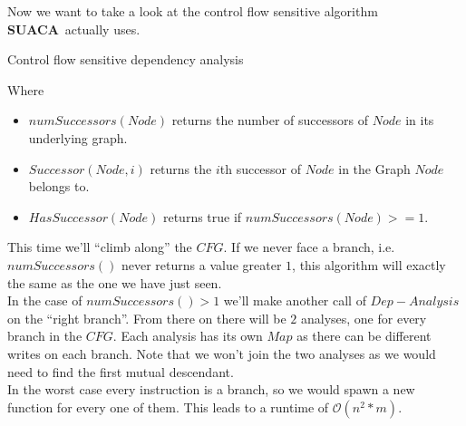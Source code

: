 \documentclass[a4paper,12pt,titlepage, twoside]{report}
\newcommand{\suaca}{\textbf{SUACA}}
\begin{document}
Now we want to take a look at the control flow sensitive algorithm \suaca\ actually uses. 

\begin{algorithm}[H]
    \SetAlgoLined
    \caption{Control flow sensitive dependency analysis}
    \label{alg:dep}
\end{algorithm}

Where
\begin{itemize}
    \item $numSuccessors(Node)$ returns the number of successors of $Node$ in its underlying graph.
    \item $Successor(Node, i)$ returns the $i$th successor of $Node$ in the Graph $Node$ belongs to.
    \item $HasSuccessor(Node)$ returns true if $numSuccessors(Node) >= 1$.
\end{itemize}

This time we'll ``climb along'' the $CFG$. If we never face a branch, i.e.\ $numSuccessors()$ never returns a value greater $1$, this algorithm will exactly the same as the one we have just seen.\\
In the case of $numSuccessors() > 1$ we'll make another call of $Dep-Analysis$ on the ``right branch''. From there on there will be $2$ analyses, one for every branch in the $CFG$. Each analysis has its own $Map$ as there can be different writes on each branch. Note that we won't join the two analyses as we would need to find the first mutual descendant.\\

In the worst case every instruction is a branch, so we would spawn a new function for every one of them. This leads to a runtime of $\mathcal{O}(n^2*m)$.\\
\end{document}
